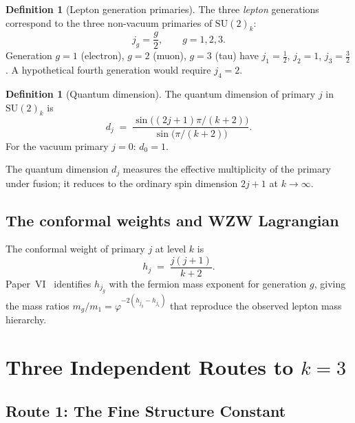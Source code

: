 \documentclass[11pt,a4paper]{article}
\theoremstyle{definition}
\newtheorem{definition}[theorem]{Definition}
\theoremstyle{remark}
\newcommand{\vp}{\varphi}
\begin{document}
\begin{definition}[Lepton generation primaries]
The three \emph{lepton} generations correspond to the three non-vacuum primaries
of $\mathrm{SU}(2)_k$:
\begin{equation}
  j_g = \frac{g}{2}, \qquad g = 1, 2, 3.
  \label{F:eq:generation_primaries}
\end{equation}
Generation $g=1$ (electron), $g=2$ (muon), $g=3$ (tau) have
$j_1=\tfrac{1}{2}$, $j_2=1$, $j_3=\tfrac{3}{2}$.
A hypothetical fourth generation would require $j_4 = 2$.
\end{definition}

\begin{definition}[Quantum dimension]
The quantum dimension of primary $j$ in $\mathrm{SU}(2)_k$ is
\begin{equation}
  d_j \;=\; \frac{\sin\!\bigl((2j+1)\pi/(k+2)\bigr)}
                  {\sin\!\bigl(\pi/(k+2)\bigr)}.
  \label{F:eq:qdim}
\end{equation}
For the vacuum primary $j=0$: $d_0 = 1$.
\end{definition}

The quantum dimension $d_j$ measures the effective multiplicity of the
primary under fusion; it reduces to the ordinary spin dimension
$2j+1$ at $k\to\infty$.

\subsection{The conformal weights and WZW Lagrangian}

The conformal weight of primary $j$ at level $k$ is
\begin{equation}
  h_j \;=\; \frac{j(j+1)}{k+2}.
  \label{F:eq:conformal_weight}
\end{equation}
Paper~VI~\cite{Paper6} identifies $h_{j_g}$ with the fermion mass
exponent for generation $g$, giving the mass ratios
$m_g/m_1 = \vp^{-2(h_{j_g}-h_{j_1})}$ that reproduce the observed
lepton mass hierarchy.

\section{Three Independent Routes to $k=3$}
\label{F:sec:routes}

\subsection{Route 1: The Fine Structure Constant}
\label{F:sec:route1}
\end{document}
